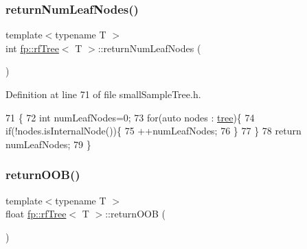 \subsubsection{\texorpdfstring{return\+Num\+Leaf\+Nodes()}{returnNumLeafNodes()}\hspace{0.1cm}{\footnotesize\ttfamily [2/2]}}
{\footnotesize\ttfamily template$<$typename T $>$ \\
int \hyperlink{classfp_1_1rfTree}{fp\+::rf\+Tree}$<$ T $>$\+::return\+Num\+Leaf\+Nodes (\begin{DoxyParamCaption}{ }\end{DoxyParamCaption})\hspace{0.3cm}{\ttfamily [inline]}}



Definition at line 71 of file small\+Sample\+Tree.\+h.


\begin{DoxyCode}
71                                                \{
72                     \textcolor{keywordtype}{int} numLeafNodes=0;
73                     \textcolor{keywordflow}{for}(\textcolor{keyword}{auto} nodes : \hyperlink{classfp_1_1rfTree_a1d5c209715f4044a85878c17e2b3ee53}{tree})\{
74                         \textcolor{keywordflow}{if}(!nodes.isInternalNode())\{
75                             ++numLeafNodes;
76                         \}
77                     \}
78                     \textcolor{keywordflow}{return} numLeafNodes;
79                 \}
\end{DoxyCode}
\mbox{\label{classfp_1_1rfTree_aee6bf6e8e695392880f1cc9ac0102ba6}} 
\subsubsection{\texorpdfstring{return\+O\+O\+B()}{returnOOB()}\hspace{0.1cm}{\footnotesize\ttfamily [1/2]}}
{\footnotesize\ttfamily template$<$typename T $>$ \\
float \hyperlink{classfp_1_1rfTree}{fp\+::rf\+Tree}$<$ T $>$\+::return\+O\+OB (\begin{DoxyParamCaption}{ }\end{DoxyParamCaption})\hspace{0.3cm}{\ttfamily [inline]}}




